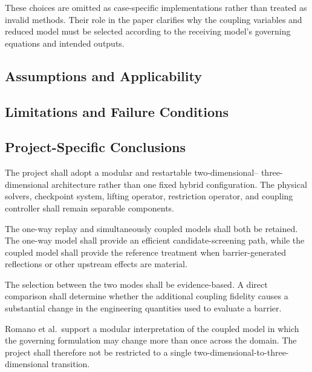 These choices are omitted as case-specific implementations rather than
treated as invalid methods. Their role in the paper clarifies why the
coupling variables and reduced model must be selected according to the
receiving model's governing equations and intended outputs.

\subsection{Assumptions and Applicability}
\label{sec:res-mod-mul-assumptions}


\subsection{Limitations and Failure Conditions}
\label{sec:res-mod-mul-limitations}


\subsection{Project-Specific Conclusions}
\label{sec:res-mod-mul-conclusions}


The project shall adopt a modular and restartable two-dimensional-- three-dimensional architecture rather than one fixed hybrid configuration. The physical solvers, checkpoint system, lifting operator, restriction operator, and coupling controller shall remain separable components.

The one-way replay and simultaneously coupled models shall both be retained. The one-way model shall provide an efficient candidate-screening path, while the coupled model shall provide the reference treatment when barrier-generated reflections or other upstream effects are material.

The selection between the two modes shall be evidence-based. A direct comparison shall determine whether the additional coupling fidelity causes a substantial change in the engineering quantities used to evaluate a barrier.

Romano et al.\ support a modular interpretation of the coupled model in
which the governing formulation may change more than once across the
domain. The project shall therefore not be restricted to a single
two-dimensional-to-three-dimensional transition.

